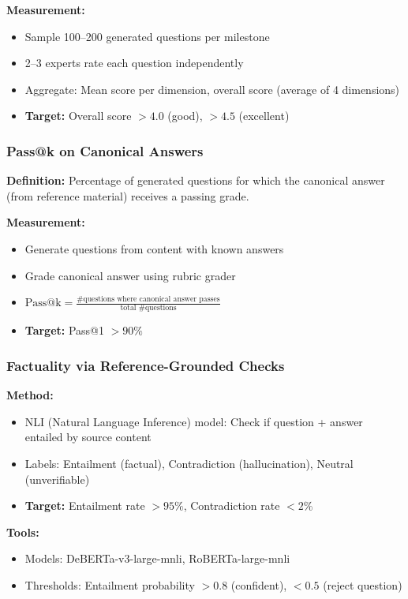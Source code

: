 \documentclass[11pt,letterpaper]{article}
\begin{document}
\textbf{Measurement:}
\begin{itemize}
\item Sample 100--200 generated questions per milestone
\item 2--3 experts rate each question independently
\item Aggregate: Mean score per dimension, overall score (average of 4 dimensions)
\item \textbf{Target:} Overall score $> 4.0$ (good), $> 4.5$ (excellent)
\end{itemize}

\subsubsection{Pass@k on Canonical Answers}\label{subsubsec:pass-at-k}

\textbf{Definition:} Percentage of generated questions for which the canonical answer (from reference material) receives a passing grade.

\textbf{Measurement:}
\begin{itemize}
\item Generate questions from content with known answers
\item Grade canonical answer using rubric grader
\item $\text{Pass@k} = \frac{\text{\# questions where canonical answer passes}}{\text{total \# questions}}$
\item \textbf{Target:} Pass@1 $> 90\%$
\end{itemize}

\subsubsection{Factuality via Reference-Grounded Checks}\label{subsubsec:factuality-checks}

\textbf{Method:}
\begin{itemize}
\item NLI (Natural Language Inference) model: Check if question + answer entailed by source content
\item Labels: Entailment (factual), Contradiction (hallucination), Neutral (unverifiable)
\item \textbf{Target:} Entailment rate $> 95\%$, Contradiction rate $< 2\%$
\end{itemize}

\textbf{Tools:}
\begin{itemize}
\item Models: DeBERTa-v3-large-mnli, RoBERTa-large-mnli
\item Thresholds: Entailment probability $> 0.8$ (confident), $< 0.5$ (reject question)
\end{itemize}
\end{document}
